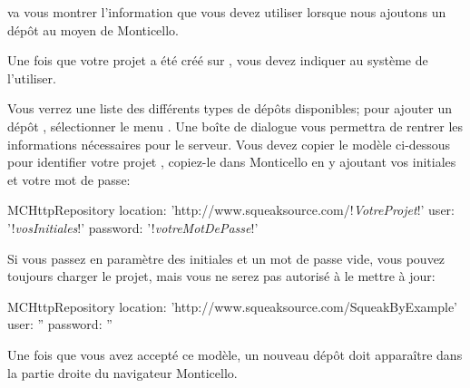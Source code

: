 \documentclass[a4paper,10pt,twoside]{book}
\begin{document}
\sqsrc va vous montrer l'information que vous devez utiliser
lorsque nous ajoutons un dépôt au moyen de Monticello.

Une fois que votre projet a été créé sur \sqsrc, vous devez indiquer au système \pharo de l'utiliser.

  Vous
verrez une liste des différents types de dépôts disponibles; pour
ajouter un dépôt \sqsrc, sélectionner le menu . Une
boîte de dialogue vous permettra de rentrer les informations
nécessaires pour le serveur.
Vous devez copier le modèle ci-dessous pour identifier votre projet
\sqsrc, copiez-le dans Monticello en y ajoutant vos initiales
et votre mot de passe:

\begin{code}{}
MCHttpRepository 
    location: 'http://www.squeaksource.com/!\emph{VotreProjet}!'
    user: '!\emph{vosInitiales}!' 
    password: '!\emph{votreMotDePasse}!'
\end{code}   

\noindent
Si vous passez en paramètre des initiales et un mot de passe vide,
vous pouvez toujours charger le projet, mais vous ne serez pas
autorisé à le mettre à jour:

\begin{code}{}
MCHttpRepository 
    location: 'http://www.squeaksource.com/SqueakByExample'
    user: '' 
    password: ''
\end{code}   

Une fois que vous avez accepté ce modèle, un nouveau dépôt doit
apparaître dans la partie droite du navigateur Monticello.
\end{document}
